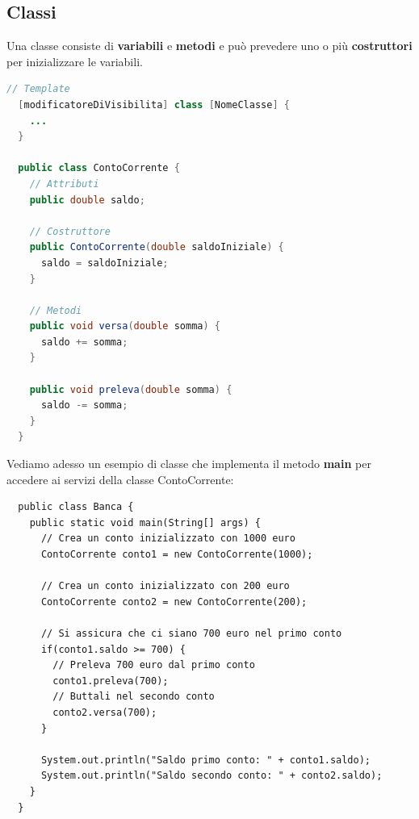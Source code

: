 \documentclass[12pt,a4paper]{article}
\begin{document}
\subsection{Classi}
Una classe consiste di \textbf{variabili} e \textbf{metodi} e può prevedere uno o più \textbf{costruttori} per inizializzare le variabili.
\begin{lstlisting}[language=Java]
  // Template
  [modificatoreDiVisibilita] class [NomeClasse] {
    ...
  }

  public class ContoCorrente {
    // Attributi
    public double saldo;

    // Costruttore
    public ContoCorrente(double saldoIniziale) {
      saldo = saldoIniziale;
    }

    // Metodi
    public void versa(double somma) {
      saldo += somma;
    }

    public void preleva(double somma) {
      saldo -= somma;
    }
  }
\end{lstlisting}
Vediamo adesso un esempio di classe che implementa il metodo \textbf{main} per accedere ai servizi della classe ContoCorrente:
\begin{lstlisting}
  public class Banca {
    public static void main(String[] args) {
      // Crea un conto inizializzato con 1000 euro
      ContoCorrente conto1 = new ContoCorrente(1000);

      // Crea un conto inizializzato con 200 euro
      ContoCorrente conto2 = new ContoCorrente(200);

      // Si assicura che ci siano 700 euro nel primo conto
      if(conto1.saldo >= 700) {
        // Preleva 700 euro dal primo conto
        conto1.preleva(700);
        // Buttali nel secondo conto
        conto2.versa(700);
      }

      System.out.println("Saldo primo conto: " + conto1.saldo);
      System.out.println("Saldo secondo conto: " + conto2.saldo);
    }
  }
\end{lstlisting}
\end{document}
